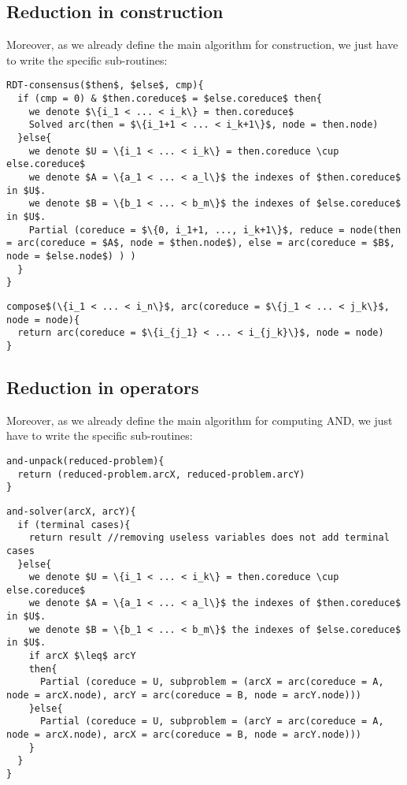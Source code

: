 \documentclass[a4paper,10pt]{article}
\begin{document}
\subsection{Reduction in construction}
Moreover, as we already define the main algorithm for construction, we just have to write the specific sub-routines:
\begin{lstlisting}
RDT-consensus($then$, $else$, cmp){
  if (cmp = 0) & $then.coreduce$ = $else.coreduce$ then{
    we denote $\{i_1 < ... < i_k\} = then.coreduce$
    Solved arc(then = $\{i_1+1 < ... < i_k+1\}$, node = then.node)
  }else{
    we denote $U = \{i_1 < ... < i_k\} = then.coreduce \cup else.coreduce$
    we denote $A = \{a_1 < ... < a_l\}$ the indexes of $then.coreduce$ in $U$.
    we denote $B = \{b_1 < ... < b_m\}$ the indexes of $else.coreduce$ in $U$.
    Partial (coreduce = $\{0, i_1+1, ..., i_k+1\}$, reduce = node(then = arc(coreduce = $A$, node = $then.node$), else = arc(coreduce = $B$, node = $else.node$) ) )
  }
}  
\end{lstlisting}
\begin{lstlisting}
compose$(\{i_1 < ... < i_n\}$, arc(coreduce = $\{j_1 < ... < j_k\}$, node = node){
  return arc(coreduce = $\{i_{j_1} < ... < i_{j_k}\}$, node = node)
}
\end{lstlisting}

\subsection{Reduction in operators}
Moreover, as we already define the main algorithm for computing AND, we just have to write the specific sub-routines:
\begin{lstlisting}
and-unpack(reduced-problem){
  return (reduced-problem.arcX, reduced-problem.arcY)
}
\end{lstlisting}
\begin{lstlisting}
and-solver(arcX, arcY){
  if (terminal cases){
    return result //removing useless variables does not add terminal cases
  }else{
    we denote $U = \{i_1 < ... < i_k\} = then.coreduce \cup else.coreduce$
    we denote $A = \{a_1 < ... < a_l\}$ the indexes of $then.coreduce$ in $U$.
    we denote $B = \{b_1 < ... < b_m\}$ the indexes of $else.coreduce$ in $U$.
    if arcX $\leq$ arcY
    then{
      Partial (coreduce = U, subproblem = (arcX = arc(coreduce = A, node = arcX.node), arcY = arc(coreduce = B, node = arcY.node)))
    }else{
      Partial (coreduce = U, subproblem = (arcY = arc(coreduce = A, node = arcX.node), arcX = arc(coreduce = B, node = arcY.node)))
    }
  }
}
\end{lstlisting}
\end{document}
